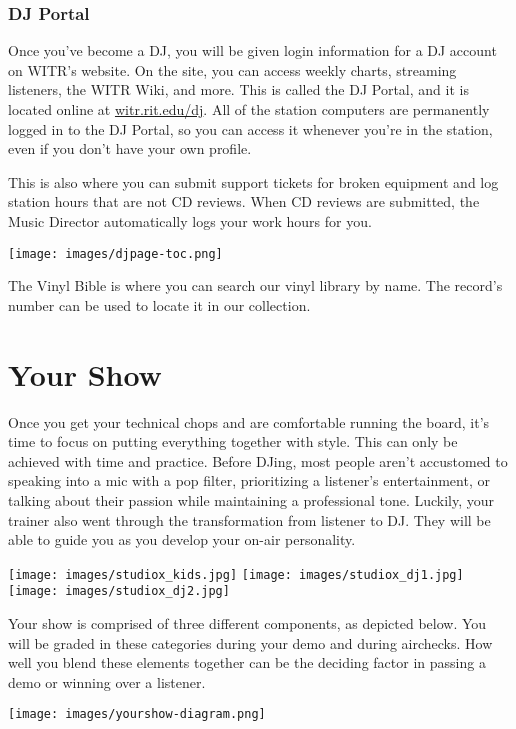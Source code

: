 \documentclass{witrman}
\begin{document}
\subsection{DJ Portal}

Once you've become a DJ, you will be given login information for a DJ account on
WITR's website.  On the site, you can access weekly charts, streaming listeners,
the WITR Wiki, and more.  This is called the DJ Portal, and it is located online
at \href{https://witr.rit.edu/dj/}{witr.rit.edu/dj}.  All of the station
computers are permanently logged in to the DJ Portal, so you can access it
whenever you're in the station, even if you don't have your own profile.

This is also where you can submit support tickets for broken equipment and log
station hours that are not CD reviews.  When CD reviews are submitted, the Music
Director automatically logs your work hours for you.

\texttt{[image: images/djpage-toc.png]}

The Vinyl Bible is where you can search our vinyl library by name.  The record's
number can be used to locate it in our collection.


\chapter{Your Show}

Once you get your technical chops and are comfortable running the board, it's
time to focus on putting everything together with style.  This can only be
achieved with time and practice.  Before DJing, most people aren't accustomed to
speaking into a mic with a pop filter, prioritizing a listener's entertainment,
or talking about their passion while maintaining a professional tone.  Luckily,
your trainer also went through the transformation from listener to DJ\@.  They
will be able to guide you as you develop your on-air personality.

\texttt{[image: images/studiox\_kids.jpg]}
\texttt{[image: images/studiox\_dj1.jpg]}
\texttt{[image: images/studiox\_dj2.jpg]}

Your show is comprised of three different components, as depicted below.  You
will be graded in these categories during your demo and during airchecks.  How
well you blend these elements together can be the deciding factor in passing a
demo or winning over a listener.

\texttt{[image: images/yourshow-diagram.png]}
\end{document}
